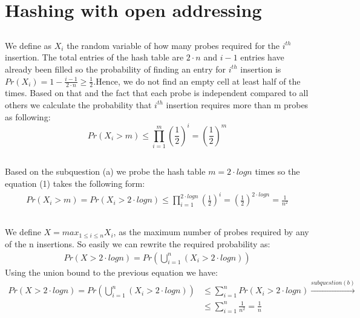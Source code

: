 \documentclass[11pt]{537homework}
\author{Emmanouil Kritharakis}
\begin{document}
\section{Hashing with open addressing}


\subsection{}
We define as $X_i$ the random variable of how many probes required for the $i^{th}$ insertion. The total entries of the hash table are $2\cdot n$ and $i-1$ entries have already been filled so the probability of finding an entry for $i^{th}$ insertion is $Pr(X_i) = 1 -\frac{i-1}{2\cdot n} \geq \frac{1}{2}$.Hence, we do not find an empty cell at least half of the times. Based on that and the fact that each probe is independent compared to all others we calculate the probability that $i^{th}$ insertion requires more than m probes as following:
\begin{equation}
    Pr(X_i > m) \leq \prod_{i=1}^{m} (\frac{1}{2})^i = (\frac{1}{2})^m
\end{equation}
\subsection{}
Based on the subquestion (a) we probe the hash table $m = 2 \cdot logn$ times so the equation (1) takes the following form:
\begin{align*}
    Pr(X_i > m) = Pr(X_i > 2 \cdot logn)\leq \prod_{i=1}^{2 \cdot logn} (\frac{1}{2})^i = (\frac{1}{2})^{2 \cdot logn} = \frac{1}{n^2}
\end{align*}
\subsection{}
We define $X = max_{1 \leq i \leq n} X_i$, as the maximum number of probes required by any of the n insertions. So easily we can rewrite the required probability as:
\begin{align*}
    Pr(X > 2 \cdot logn) = Pr (\bigcup_{i=1}^{n} (X_i > 2 \cdot logn))
\end{align*}
Using the union bound to the previous equation we have:
\begin{align*}
    Pr(X > 2 \cdot logn) = Pr (\bigcup_{i=1}^{n} (X_i > 2 \cdot logn)) &\leq \sum_{i=1}^{n} Pr(X_i > 2 \cdot logn) \xrightarrow{subquestion(b)} \\
    &\leq \sum_{i=1}^{n} \frac{1}{n^2} = \frac{1}{n}
\end{align*}
\end{document}
